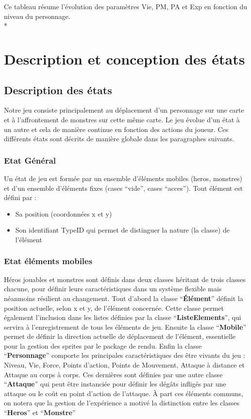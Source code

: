 \documentclass[11pt, a4paper]{article}
\begin{document}
Ce tableau résume l’évolution des paramètres Vie, PM, PA et Exp en fonction du niveau du personnage.\\*

\section{Description et conception des états}

\subsection{Description des états}

Notre jeu consiste principalement au déplacement d’un personnage sur une carte et à l’affrontement de monstres sur cette même carte. Le jeu évolue d’un état à un autre et cela de manière continue en fonction des actions du joueur. Ces différents états sont décrits de manière globale dans les paragraphes suivants.

\subsubsection{Etat Général}

Un état de jeu est formée par un ensemble d’éléments mobiles (heros, monstres) et d’un ensemble d’éléments fixes (cases “vide”, cases “acces”). Tout élément est défini par :
\begin{itemize}
\item Sa position (coordonnées x et y)
\item Son identifiant TypeID qui permet de distinguer la nature (la classe) de l’élément
\end{itemize} 

\subsubsection{Etat éléments mobiles}
Héros jouables et monstres sont définis dans deux classes héritant de trois classes chacune, pour définir leurs caractéristiques dans un système flexible mais néanmoins résilient au changement. Tout d’abord la classe “\textbf{Élément}” définit la position actuelle, selon x et y, de l’élément concernée. Cette classe permet également l’inclusion dans les listes définies par la classe “\textbf{ListeElements}”, qui servira à l’enregistrement de tous les éléments de jeu. Ensuite la classe “\textbf{Mobile}” permet de définir la direction actuelle de déplacement de l’élément, essentielle pour la gestion des sprites par le package de rendu. Enfin la classe “\textbf{Personnage}” comporte les principales caractéristiques des être vivants du jeu : Niveau, Vie, Force, Points d’action, Points de Mouvement, Attaque à distance et Attaque au corps à corps. Ces dernières sont définies par une autre classe “\textbf{Attaque}” qui peut être instanciée pour définir les dégâts infligés par une attaque ou le coût en point d’action de l’attaque. À part ces éléments communs, on notera que la gestion de l’expérience a motivé la distinction entre les classes “\textbf{Heros}” et “\textbf{Monstre}”
\end{document}
